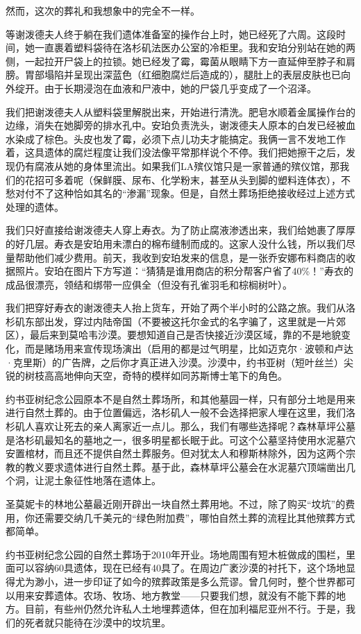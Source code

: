 \documentclass[12pt,oneside]{book}
\begin{document}
然而，这次的葬礼和我想象中的完全不一样。

等谢泼德夫人终于躺在我们遗体准备室的操作台上时，她已经死了六周。这段时间，她一直裹着塑料袋待在洛杉矶法医办公室的冷柜里。我和安珀分别站在她的两侧，一起拉开尸袋上的拉锁。她已经发了霉，霉菌从眼睛下方一直延伸至脖子和肩膀。胃部塌陷并呈现出深蓝色（红细胞腐烂后造成的），腿肚上的表层皮肤也已向外绽开。由于长期浸泡在血液和尸液中，她的尸袋几乎变成了一个沼泽。

我们把谢泼德夫人从塑料袋里解脱出来，开始进行清洗。肥皂水顺着金属操作台的边缘，消失在她脚旁的排水孔中。安珀负责洗头，谢泼德夫人原本的白发已经被血水染成了棕色。头皮也发了霉，必须下点儿功夫才能搞定。我俩一言不发地工作着，这具遗体的腐烂程度让我们没法像平常那样说个不停。我们把她擦干之后，发现仍有腐液从她的身体里流出。如果我们LA殡仪馆只是一家普通的殡仪馆，那我们的花招可多着呢（保鲜膜、尿布、化学粉末，甚至从头到脚的塑料连体衣），不愁对付不了这种恰如其名的“渗漏”现象。但是，自然土葬场拒绝接收经过上述方式处理的遗体。

我们只好直接给谢泼德夫人穿上寿衣。为了防止腐液渗透出来，我们给她裹了厚厚的好几层。寿衣是安珀用未漂白的棉布缝制而成的。这家人没什么钱，所以我们尽量帮助他们减少费用。前天，我收到安珀发来的信息，是一张乔安娜布料商店的收据照片。安珀在图片下方写道：“猜猜是谁用商店的积分帮客户省了40\%！”寿衣的成品很漂亮，领结和绑带一应俱全（但没有孔雀羽毛和棕榈树叶）。

我们把穿好寿衣的谢泼德夫人抬上货车，开始了两个半小时的公路之旅。我们从洛杉矶东部出发，穿过内陆帝国（不要被这托尔金式的名字骗了，这里就是一片郊区），最后来到莫哈韦沙漠。要想知道自己是否快接近沙漠区域，靠的不是地貌变化，而是赌场用来宣传现场演出（启用的都是过气明星，比如迈克尔·波顿和卢达·克里斯）的广告牌，之后你才真正进入沙漠。沙漠中，约书亚树（短叶丝兰）尖锐的树枝高高地伸向天空，奇特的模样如同苏斯博士笔下的角色。

约书亚树纪念公园原本不是自然土葬场所，和其他墓园一样，只有部分土地是用来进行自然土葬的。由于位置偏远，洛杉矶人一般不会选择把家人埋在这里，我们洛杉矶人喜欢让死去的亲人离家近一点儿。那么，我们有哪些选择呢？森林草坪公墓是洛杉矶最知名的墓地之一，很多明星都长眠于此。可这个公墓坚持使用水泥墓穴安置棺材，而且还不提供自然土葬服务。但对犹太人和穆斯林除外，因为这两个宗教的教义要求遗体进行自然土葬。基于此，森林草坪公墓会在水泥墓穴顶端凿出几个洞，让泥土象征性地落在遗体上。

圣莫妮卡的林地公墓最近刚开辟出一块自然土葬用地。不过，除了购买“坟坑”的费用，你还需要交纳几千美元的“绿色附加费”，哪怕自然土葬的流程比其他殡葬方式都简单。

约书亚树纪念公园的自然土葬场于2010年开业。场地周围有短木桩做成的围栏，里面可以容纳60具遗体，现在已经有40具了。在周边广袤沙漠的衬托下，这个场地显得尤为渺小，进一步印证了如今的殡葬政策是多么荒谬。曾几何时，整个世界都可以用来安葬遗体。农场、牧场、地方教堂——只要我们想，就没有不能下葬的地方。目前，有些州仍然允许私人土地埋葬遗体，但在加利福尼亚州不行。于是，我们的死者就只能待在沙漠中的坟坑里。
\end{document}
